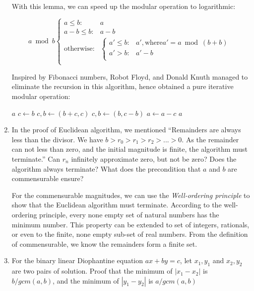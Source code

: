 \documentclass[UTF8]{article}
\begin{document}
\begin{enumerate}
With this lemma, we can speed up the modular operation to logarithmic:

\[
a \bmod b \begin{cases}
a \leq b: & a \\
a - b \leq b: & a - b \\
\text{otherwise}: & \begin{cases}
  a' \leq b: & a', \text{where} a' = a \bmod (b + b) \\
  a' > b: & a' - b \\
  \end{cases} \\
\end{cases}
\]

Inspired by Fibonacci numbers, Robot Floyd, and Donald Knuth managed to eliminate the recursion in this algorithm, hence obtained a pure iterative modular operation:

\begin{algorithmic}
    \State \Return $a$
  \EndIf
  \State $c \gets b$
    \State $c, b \gets (b + c, c)$ 
  \EndWhile
    \State $c, b \gets (b, c - b)$ 
      \State $a \gets a - c$
    \EndIf
  \EndWhile
  \State \Return $a$
\EndFunction
\end{algorithmic}

\item {In the proof of Euclidean algorithm, we mentioned ``Remainders are always less than the divisor. We have $b > r_0 > r_1 > r_2 > ... > 0$. As the remainder can not less than zero, and the initial magnitude is finite, the algorithm must terminate.'' Can $r_{n}$ infinitely approximate zero, but not be zero? Does the algorithm always terminate? What does the precondition that $a$ and $b$ are commensurable ensure?}

For the commensurable magnitudes, we can use the {\em Well-ordering principle} to show that the Euclidean algorithm must terminate. According to the well-ordering principle, every none empty set of natural numbers has the minimum number. This property can be extended to set of integers, rationals, or even to the finite, none empty sub-set of real numbers. From the definition of commensurable, we know the remainders form a finite set.

\item {For the binary linear Diophantine equation $ax + by = c$, let $x_1, y_1$ and $x_2, y_2$ are two pairs of solution. Proof that the minimum of $|x_1 - x_2|$ is $b/gcm(a, b)$, and the minimum of $|y_1 - y_2|$ is $a/gcm(a, b)$}


\end{enumerate}
\end{document}
